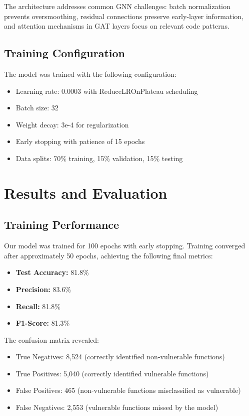 The architecture addresses common GNN challenges: batch normalization prevents oversmoothing, residual connections preserve early-layer information, and attention mechanisms in GAT layers focus on relevant code patterns.

\subsection{Training Configuration}

The model was trained with the following configuration:
\begin{itemize}
\item Learning rate: 0.0003 with ReduceLROnPlateau scheduling
\item Batch size: 32
\item Weight decay: 3e-4 for regularization
\item Early stopping with patience of 15 epochs
\item Data splits: 70\% training, 15\% validation, 15\% testing
\end{itemize}

\section{Results and Evaluation}
\label{sec:results}

\subsection{Training Performance}

Our model was trained for 100 epochs with early stopping. Training converged after approximately 50 epochs, achieving the following final metrics:

\begin{itemize}
\item \textbf{Test Accuracy:} 81.8\%
\item \textbf{Precision:} 83.6\% 
\item \textbf{Recall:} 81.8\%
\item \textbf{F1-Score:} 81.3\%
\end{itemize}

The confusion matrix revealed:
\begin{itemize}
\item True Negatives: 8,524 (correctly identified non-vulnerable functions)
\item True Positives: 5,040 (correctly identified vulnerable functions)  
\item False Positives: 465 (non-vulnerable functions misclassified as vulnerable)
\item False Negatives: 2,553 (vulnerable functions missed by the model)
\end{itemize}

